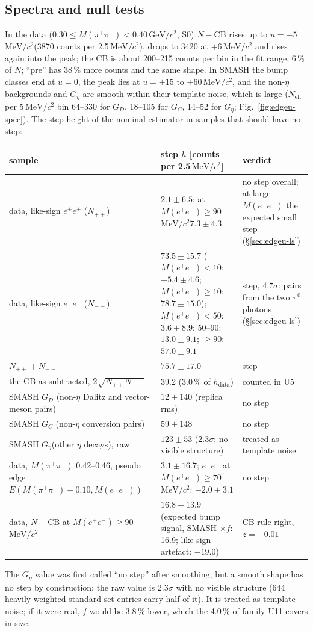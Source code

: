 \documentclass[11pt,a4paper]{article}
\newcommand{\piz}{\ensuremath{\pi^{0}}\xspace}
\newcommand{\Mee}{\ensuremath{M(e^{+}e^{-})}\xspace}
\newcommand{\Mpipi}{\ensuremath{M(\pi^{+}\pi^{-})}\xspace}
\newcommand{\GeVcc}{\ensuremath{\mathrm{GeV}/c^{2}}\xspace}
\newcommand{\MeVcc}{\ensuremath{\mathrm{MeV}/c^{2}}\xspace}
\newcommand{\Geta}{\ensuremath{G_\eta}\xspace}
\begin{document}
\subsection{Spectra and null tests}
\label{sec:edgeu-spec}
In the data ($0.30\le\Mpipi<0.40$\,\GeVcc, S0) $N-\mathrm{CB}$ rises up to $u=-5$\,\MeVcc (3870 counts per 2.5\,\MeVcc), drops to 3420 at $+6$\,\MeVcc
and rises again into the peak; the CB is about 200--215 counts per bin in the fit range, 6\,\% of $N$; ``pre'' has 38\,\% more counts and the same shape.
In SMASH the bump classes end at $u=0$, the peak lies at $u=+15$ to $+60$\,\MeVcc, and the non-$\eta$ backgrounds and \Geta are smooth within their
template noise, which is large ($N_{\mathrm{eff}}$ per 5\,\MeVcc bin 64--330 for $G_D$, 18--105 for $G_C$, 14--52 for \Geta; Fig.~\ref{fig:edgeu-spec}).
The step height of the nominal estimator in samples that should have no step:
\begin{center}\small
\begin{tabularx}{\textwidth}{@{}>{\raggedright\arraybackslash}p{5.9cm} L >{\raggedright\arraybackslash}p{3.3cm}@{}}
\toprule
sample & step $h$ [counts per 2.5\,\MeVcc] & verdict \\
\midrule
data, like-sign $e^+e^+$ ($N_{++}$) & $2.1\pm6.5$; at \Mee$\ge90$\,\MeVcc $7.3\pm4.3$ & no step overall; at large \Mee the expected small step (\S\ref{sec:edgeu-ls}) \\
data, like-sign $e^-e^-$ ($N_{--}$) & $73.5\pm15.7$ (\Mee$<10$: $-5.4\pm4.6$; \Mee$\ge10$: $78.7\pm15.0$); \Mee$<50$: $3.6\pm8.9$; 50--90: $13.0\pm9.1$; $\ge90$: $57.0\pm9.1$ & step, 4.7$\sigma$: pairs from the two \piz photons (\S\ref{sec:edgeu-ls}) \\
$N_{++}+N_{--}$ & $75.7\pm17.0$ & step \\
the CB as subtracted, $2\sqrt{N_{++}N_{--}}$ & 39.2 (3.0\,\% of $h_{\mathrm{data}}$) & counted in U5 \\
SMASH $G_D$ (non-$\eta$ Dalitz and vector-meson pairs) & $12\pm140$ (replica rms) & no step \\
SMASH $G_C$ (non-$\eta$ conversion pairs) & $59\pm148$ & no step \\
SMASH \Geta (other $\eta$ decays), raw & $123\pm53$ (2.3$\sigma$; no visible structure) & treated as template noise \\
data, \Mpipi 0.42--0.46, pseudo edge $E(\Mpipi-0.10,\Mee)$ & $3.1\pm16.7$; $e^-e^-$ at \Mee$\ge70$\,\MeVcc: $-2.0\pm3.1$ & no step \\
data, $N-\mathrm{CB}$ at \Mee$\ge90$\,\MeVcc & $16.8\pm13.9$ (expected bump signal, SMASH $\times f$: 16.9; like-sign artefact: $-19.0$) & CB rule right, $z=-0.01$ \\
\bottomrule
\end{tabularx}
\end{center}
The \Geta value was first called ``no step'' after smoothing, but a smooth shape has no step by construction; the raw value is 2.3$\sigma$ with no
visible structure (644 heavily weighted standard-set entries carry half of it). It is treated as template noise; if it were real, $f$ would be
3.8\,\% lower, which the 4.0\,\% of family U11 covers in size.
\end{document}
